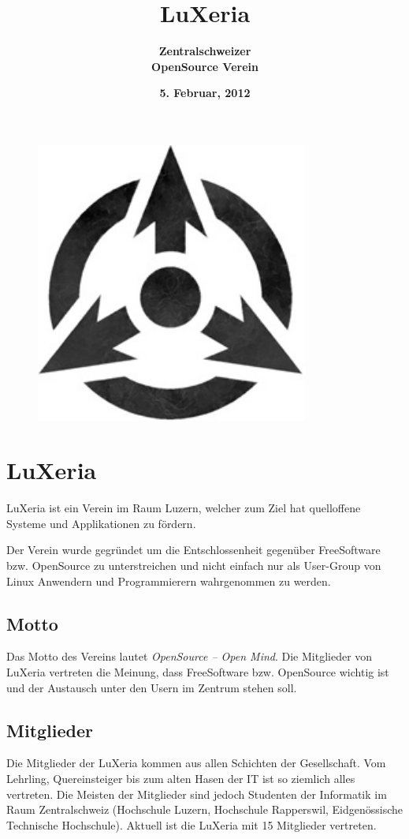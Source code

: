 \documentclass[10pt,foldmark,notumble]{leaflet}
\title{\bf LuXeria}
\author{%
\Large \bf Zentralschweizer\\\bf OpenSource Verein
}
\date{\bf 5. Februar, 2012 }
\begin{document}
\clearpage
\thispagestyle{empty}
\maketitle

\vfill
\begin{figure}
\centering
\includegraphics[width=0.8\textwidth]{lux_logo.png}
\end{figure}


\newpage
\section{LuXeria}
LuXeria ist ein Verein im Raum Luzern, welcher zum Ziel hat 
quelloffene Systeme und Applikationen zu fördern.


Der Verein wurde gegründet um die Entschlossenheit gegenüber
FreeSoftware bzw. OpenSource zu unterstreichen und nicht einfach 
nur als User-Group von Linux Anwendern und Programmierern wahrgenommen
zu werden.

\subsection{Motto}
Das Motto des Vereins lautet \emph{OpenSource -- Open Mind}.
Die Mitglieder von LuXeria vertreten die Meinung, dass 
FreeSoftware bzw. OpenSource wichtig ist und der Austausch 
unter den Usern im Zentrum stehen soll. 

\subsection{Mitglieder}
Die Mitglieder der LuXeria kommen aus allen Schichten der Gesellschaft.
Vom Lehrling, Quereinsteiger bis zum alten Hasen der IT ist so ziemlich 
alles vertreten. Die Meisten der Mitglieder sind jedoch Studenten der 
Informatik im Raum Zentralschweiz (Hochschule Luzern, Hochschule 
Rapperswil, Eidgenössische Technische Hochschule). 
Aktuell ist die LuXeria mit 15 Mitglieder vertreten.
\end{document}
